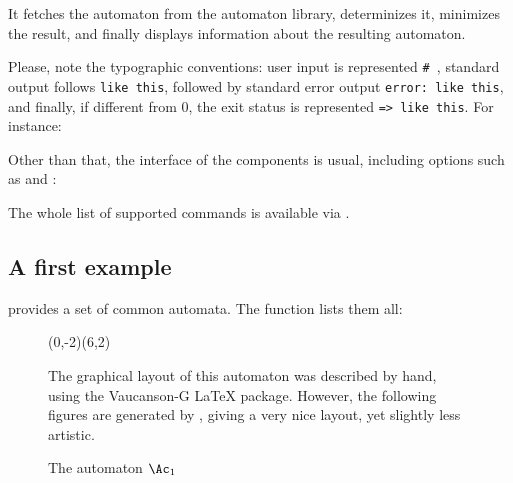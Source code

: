 
\noindent
It fetches the automaton  from the automaton library,
determinizes it, minimizes the result, and finally displays
information about the resulting automaton.

Please, note the typographic conventions: user input is represented
\texttt{\# }, standard output follows \texttt{like
  this}, followed by standard error output \texttt{error: like this},
and finally, if different from 0, the exit status is represented
\texttt{=> like this}.  For instance:


\smallskip

Other than that, the interface of the \tafkit components is usual,
including options such as  and :


The whole list of supported commands is available via
.

\subsection{A first example}

\Vauc provides a set of common automata.  The function
 lists them all:


\begin{figure}[ht] \centering
  \begin{VCPicture}{(0,-2)(6,2)}
  \end{VCPicture}
  \begin{legend}
    The graphical layout of this automaton was described by hand,
    using the Vaucanson-G \LaTeX{} package.  However, the following
    figures are generated by \tafkit, giving a very nice layout, yet
    slightly less artistic.
  \end{legend}
  \caption{The automaton $\Ac_1$}
  \label{fig:a1}
\end{figure}

